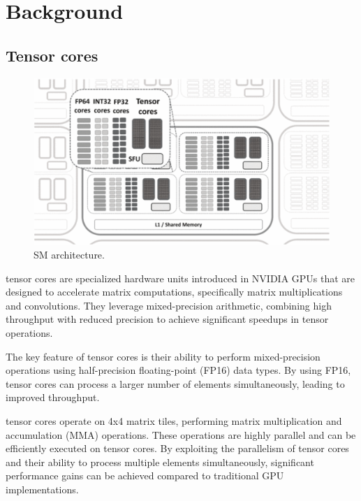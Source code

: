 \documentclass[conference]{IEEEtran}
\begin{document}
  \section{Background}\label{sec:background}
  
  \subsection{Tensor cores}\label{sec:tensor-cores}
  \begin{figure}[htbp]
    \centering
    \includegraphics[scale=0.32]{figures/SM.png}
    \caption{SM architecture.\cite{NVIDIA_Tensor_Core_Programmability_KTH}}
    \label{fig:performance-comparison}
  \end{figure}

  tensor cores are specialized hardware units introduced in NVIDIA GPUs that are designed to accelerate matrix computations, 
  specifically matrix multiplications and convolutions. They leverage mixed-precision arithmetic, 
  combining high throughput with reduced precision to achieve significant speedups in tensor operations.
  
  The key feature of tensor cores is their ability to perform mixed-precision operations using 
  half-precision floating-point (FP16) data types. By using FP16, tensor cores can process a larger 
  number of elements simultaneously, leading to improved throughput. 
  
  tensor cores operate on 4x4 matrix tiles, performing matrix multiplication and accumulation (MMA) 
  operations. These operations are highly parallel and can be efficiently executed on tensor cores. 
  By exploiting the parallelism of tensor cores and their ability to process multiple elements 
  simultaneously, significant performance gains can be achieved compared to traditional GPU 
  implementations.
  
\end{document}
